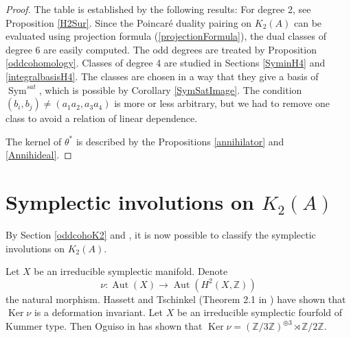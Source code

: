 \documentclass{alggeom}
\DeclareMathOperator{\Aut}{Aut}
\DeclareMathOperator{\Ker}{Ker}
\DeclareMathOperator{\Sym}{Sym}
\newcommand{\kum}[2]{K_{ #2 }( #1 )}
\newcommand{\Z}{\mathbb{Z}}
\theoremstyle{plain}
\theoremstyle{definition}
\theoremstyle{remark}
\begin{document}
\begin{proof}
The table is established by the following results:
For degree 2, see Proposition \ref{H2Sur}. Since the Poincar\'e duality pairing on $\kum{A}{2}$ can be evaluated using projection formula (\ref{projectionFormula}), the dual classes of degree 6 are easily computed.
The odd degrees are treated by Proposition \ref{oddcohomology}. Classes of degree 4 are studied in Sections \ref{SyminH4} and \ref{integralbasisH4}. The classes are chosen in a way that they give a basis of $\Sym^{sat}$, which is possible by Corollary \ref{SymSatImage}. The condition $(b_i,b_j)\neq(a_1a_2,a_3a_4)$ is more or less arbitrary, but we had to remove one class to avoid a relation of linear dependence.

The kernel of $\theta^*$ is described by the Propositions \ref{annihilator} and \ref{Annihideal}.
\end{proof}

\section{Symplectic involutions on $K_{2}(A)$}\label{Involution} 
By Section \ref{oddcohoK2} and \cite{MongWanTari}, it is now possible to classify the symplectic involutions on $K_{2}(A)$.

Let $X$ be an irreducible symplectic manifold. Denote $$\nu: \Aut (X)\rightarrow \Aut (H^{2}(X,\Z))$$
the natural morphism. Hassett and Tschinkel (Theorem 2.1 in \cite{Hassett}) have shown that $\Ker \nu$ is a deformation invariant. 
Let $X$ be an irreducible symplectic fourfold of Kummer type. Then Oguiso in \cite{Oguiso} has shown that $\Ker \nu =(\Z/3\Z)^{\oplus3}\rtimes\Z/2\Z$.
\end{document}
